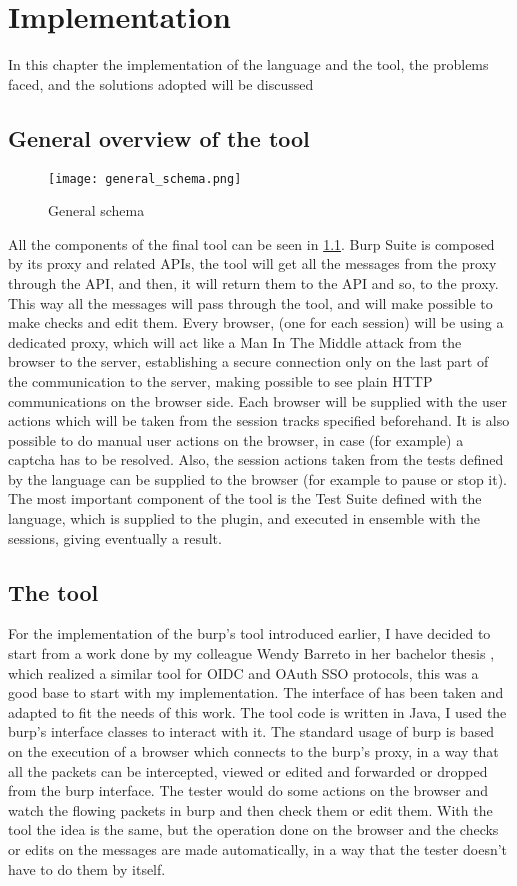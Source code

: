 \chapter{Implementation}
In this chapter the implementation of the language and the tool, the problems faced, and the solutions adopted will be discussed

\section{General overview of the tool}
\begin{figure}
    \texttt{[image: general\_schema.png]}
    \caption{General schema}
    \label{fig:general_schema}
\end{figure}

All the components of the final tool can be seen in \ref{fig:general_schema}. Burp Suite is composed by its proxy and related APIs, the tool will get all the messages from the proxy through the API, and then, it will return them to the API and so, to the proxy. This way all the messages will pass through the tool, and will make possible to make checks and edit them.
Every browser, (one for each session) will be using a dedicated proxy, which will act like a Man In The Middle attack from the browser to the server, establishing a secure connection only on the last part of the communication to the server, making possible to see plain HTTP communications on the browser side. Each browser will be supplied with the user actions which will be taken from the session tracks specified beforehand. It is also possible to do manual user actions on the browser, in case (for example) a captcha has to be resolved. Also, the session actions taken from the tests defined by the language can be supplied to the browser (for example to pause or stop it). The most important component of the tool is the Test Suite defined with the language, which is supplied to the plugin, and executed in ensemble with the sessions, giving eventually a result.

\section{The tool}
For the implementation of the \Gls{burp}'s tool introduced earlier, I have decided to start from a work done by my colleague Wendy Barreto in her bachelor thesis \cite{wendy_barreto}, which realized a similar tool for \Gls{OIDC} and \Gls{OAuth} SSO protocols, this was a good base to start with my implementation. The interface of \cite{wendy_barreto} has been taken and adapted to fit the needs of this work. The tool code is written in Java, I used the \Gls{burp}'s interface classes to interact with it.
The standard usage of \Gls{burp} is based on the execution of a browser which connects to the \Gls{burp}'s proxy, in a way that all the packets can be intercepted, viewed or edited and forwarded or dropped from the \Gls{burp} interface. The tester would do some actions on the browser and watch the flowing packets in \Gls{burp} and then check them or edit them. With the tool the idea is the same, but the operation done on the browser and the checks or edits on the messages are made automatically, in a way that the tester doesn't have to do them by itself.

